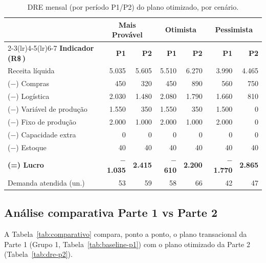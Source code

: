 \documentclass[11pt,a4paper]{article}
\newcommand{\rs}{R\$\,}
\begin{document}
\begin{table}[H]
\centering
\caption{DRE mensal (por período P1/P2) do plano otimizado, por cenário.}
\label{tab:dre-mensal}
\footnotesize
\setlength{\tabcolsep}{4.5pt}
\begin{tabular}{lrrrrrr}
\toprule
 & \multicolumn{2}{c}{\textbf{Mais Provável}} & \multicolumn{2}{c}{\textbf{Otimista}} & \multicolumn{2}{c}{\textbf{Pessimista}} \\
\cmidrule(lr){2-3}\cmidrule(lr){4-5}\cmidrule(lr){6-7}
\textbf{Indicador (\rs)} & \textbf{P1} & \textbf{P2} & \textbf{P1} & \textbf{P2} & \textbf{P1} & \textbf{P2} \\
\midrule
Receita líquida            & 5.035 & 5.605 & 5.510 & 6.270 & 3.990 & 4.465 \\
($-$) Compras              & 450   & 320   & 450   & 890   & 560   & 750   \\
($-$) Logística            & 2.030 & 1.480 & 2.080 & 1.790 & 1.660 & 810   \\
($-$) Variável de produção & 1.550 & 350   & 1.550 & 350   & 1.500 & 0     \\
($-$) Fixo de produção     & 2.000 & 1.000 & 2.000 & 1.000 & 2.000 & 0     \\
($-$) Capacidade extra     & 0     & 0     & 0     & 0     & 0     & 0     \\
($-$) Estoque              & 40    & 40    & 40    & 40    & 40    & 40    \\
\textbf{(=) Lucro}         & \textbf{$-$1.035} & \textbf{2.415} & \textbf{$-$610} & \textbf{2.200} & \textbf{$-$1.770} & \textbf{2.865} \\
Demanda atendida (un.)     & 53 & 59 & 58 & 66 & 42 & 47 \\
\bottomrule
\end{tabular}
\end{table}

\subsection{Análise comparativa Parte 1 vs Parte 2}

A Tabela~\ref{tab:comparativo} compara, ponto a ponto, o plano transacional da Parte 1 (Grupo 1, Tabela~\ref{tab:baseline-p1}) com o plano otimizado da Parte 2 (Tabela~\ref{tab:dre-p2}).
\end{document}
